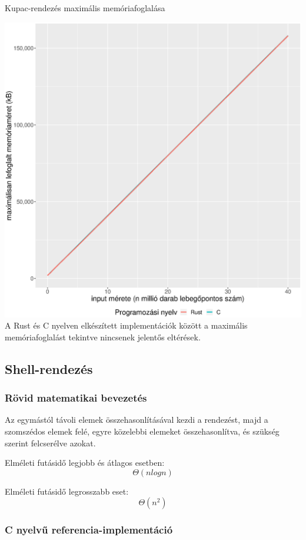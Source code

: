 \noindent Kupac-rendezés maximális memóriafoglalása

\includegraphics[width=15.5cm]{kepek/heap_sort_memory.eps}
A Rust és C nyelven elkészített implementációk között a maximális memóriafoglalást tekintve nincsenek jelentős eltérések.

\subsection{Shell-rendezés}
\subsubsection{Rövid matematikai bevezetés}
Az egymástól távoli elemek összehasonlításával kezdi a rendezést, majd a szomszédos elemek felé, egyre közelebbi elemeket összehasonlítva, és szükség szerint felcserélve azokat. 

Elméleti futásidő legjobb és átlagos esetben:
\[\Theta(n log n) \]

Elméleti futásidő legrosszabb eset:
\[\Theta(n^2)\]

\subsubsection{C nyelvű referencia-implementáció}
